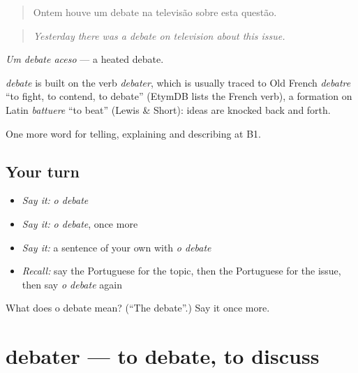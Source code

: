 \begin{quote}
Ontem houve um debate na televisão sobre esta questão.
\end{quote}

\begin{quote}
\emph{Yesterday there was a debate on television about this issue.}
\end{quote}

\emph{Um debate aceso} — a heated debate.

\begin{cousinweb}
\emph{debate} is built on the verb \emph{debater}, which is usually traced to Old French \emph{debatre} \textquotedblleft{}to fight, to contend, to debate\textquotedblright{} (EtymDB lists the French verb), a formation on Latin \emph{battuere} \textquotedblleft{}to beat\textquotedblright{} (Lewis \& Short): ideas are knocked back and forth.
\end{cousinweb}

\begin{grammarlens}[title={What you've built}]
One more word for telling, explaining and describing at B1.
\end{grammarlens}

\subsection*{Your turn}
\begin{itemize}
\raggedright
  \item \emph{Say it:} \emph{o debate}
  \item \emph{Say it:} \emph{o debate}, once more
  \item \emph{Say it:} a sentence of your own with \emph{o debate}
  \item \emph{Recall:} say the Portuguese for the topic, then the Portuguese for the issue, then say \emph{o debate} again
\end{itemize}

\begin{tcolorbox}[breakable,colback=teal!4,colframe=teal!35!black,title={Before you move on}]
What does o debate mean? (\textquotedblleft{}The debate\textquotedblright{}.) Say it once more.
\end{tcolorbox}
\section[debater]{debater — to debate, to discuss}

\label{lesson:PT-C336-debater}



